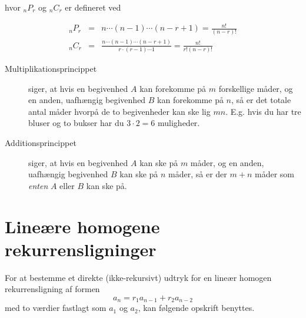 \documentclass[a4paper]{article}
\begin{document}
hvor $_nP_r$ og $_nC_r$ er defineret ved

\begin{eqnarray*}
    _nP_r &=& n\cdots{}(n-1)\cdots{}(n-r+1) = \frac{n!}{(n-r)!} \\
    _nC_r &=& \frac{n\cdots (n-1) \cdots (n-r+1)}{r\cdot (r-1)\cdots 1} = \frac{n!}{r!(n-r)!}
\end{eqnarray*}

\begin{description}

\item[Multiplikationsprincippet] siger, at hvis en begivenhed $A$ kan forekomme på $m$ forskellige
måder, og en anden, uafhængig begivenhed $B$ kan forekomme på $n$, så er det totale antal måder
hvorpå de to begivenheder kan ske lig $mn$. E.g. hvis du har tre bluser og to bukser har du
$3 \cdot 2 = 6$ muligheder.

\item[Additionsprincippet] siger, at hvis en begivenhed $A$ kan ske på $m$ måder, og en anden,
uafhængig begivenhed $B$ kan ske på $n$ måder, så er der $m + n$ måder som {\it enten} $A$ eller $B$
kan ske på.

\end{description}

\section{Lineære homogene rekurrensligninger}

For at bestemme et direkte (ikke-rekursivt) udtryk for en lineær homogen rekurrensligning
af formen $$a_n = r_1a_{n - 1} + r_2a_{n - 2}$$ med to værdier fastlagt som $a_1$ og $a_2$,
kan følgende opskrift benyttes.
\end{document}
